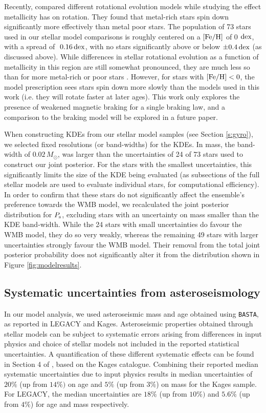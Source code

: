 \documentclass[12pt]{article}
\newcommand{\feh}{\mbox{$\rm{[Fe/H]}$}\xspace}
\begin{document}
Recently, \cite{amard+matt2020} compared different rotational evolution models \cite[][of which we use the former in this work]{vansaders+pinsonneault2013,matt+2015} while studying the effect metallicity has on rotation. They found that metal-rich stars spin down significantly more effectively than metal poor stars. The population of 73 stars used in our stellar model comparisons is roughly centered on a $\rm{[Fe/H]}$ of 0 $\rm dex$, with a spread of $~0.16\, \rm dex$, with no stars significantly above or below $\pm 0.4\, \rm dex$ (as discussed above). While differences in stellar rotational evolution as a function of metallicity in this region are still somewhat pronounced, they are much less so than for more metal-rich or poor stars \cite[see Figure 2][]{amard+matt2020}. However, for stars with $\feh < 0$, the \cite{matt+2015} model prescription sees stars spin down more slowly than the models used in this work (i.e. they will rotate faster at later ages). This work only explores the presence of weakened magnetic braking for a single braking law, and a comparison to the \cite{matt+2015} braking model will be explored in a future paper.

When constructing KDEs from our stellar model samples (see Section \ref{s:gyro}), we selected fixed resolutions (or band-widths) for the KDEs. In mass, the band-width of $0.02\, M_\odot$, was larger than the uncertainties of 24 of 73 stars used to construct our joint posterior. For the stars with the smallest uncertainties, this significantly limits the size of the KDE being evaluated (as subsections of the full stellar models are used to evaluate individual stars, for computational efficiency). In order to confirm that these stars do not significantly affect the ensemble's preference towards the WMB model, we recalculated the joint posterior distribution for $P_{\rm s}$, excluding stars with an uncertainty on mass smaller than the KDE band-width. While the 24 stars with small uncertainties do favour the WMB model, they do so very weakly, whereas the remaining 49 stars with larger uncertainties strongly favour the WMB model. Their removal from the total joint posterior probability does not significantly alter it from the distribution shown in Figure \ref{fig:modelresults}.

\subsection{Systematic uncertainties from asteroseismology}
In our model analysis, we used asteroseismic mass and age obtained using \texttt{BASTA}, as reported in LEGACY and Kages. Asteroseismic properties obtained through stellar models can be subject to systematic errors arising from differences in input physics and choice of stellar models not included in the reported statistical uncertainties. A quantification of these different systematic effects can be found in Section 4 of \cite{silvaaguirre+2015}, based on the Kages catalogue. Combining their reported median systematic uncertainties due to input physics results in median uncertainties of $20\%$ (up from $14\%)$ on age and $5\%$ (up from $3\%$) on mass for the Kages sample. For LEGACY, the median uncertainties are $18\%$ (up from $10\%)$ and $5.6\%$ (up from $4\%$) for age and mass respectively.
\end{document}
